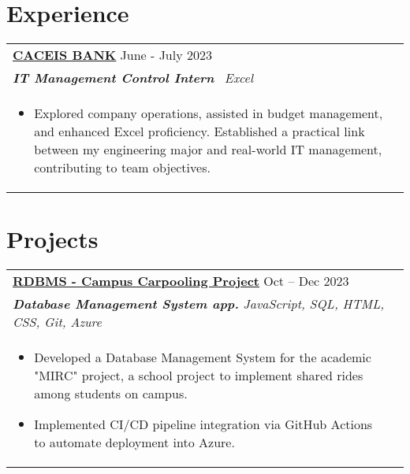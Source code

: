 \documentclass[a4paper,8pt]{article}
\begin{document}
\section{Experience}
\begin{tabularx}{\linewidth}{ @{}l r@{} }
\textbf{\uline{\href{https://www.linkedin.com/company/caceis/}{CACEIS BANK}}} \hfill \color[HTML]{371e77} June - July 2023 \\[4pt]
\color[HTML]{371e77}\textbf{\textit{IT Management Control Intern}}\ \hfill \color[HTML]{4B28A4} \textit{Excel} \\[5pt]
\begin{minipage}[t]{\linewidth}
    \begin{itemize}[nosep,after=\strut, leftmargin=2em, itemsep=2pt]
        \item Explored company operations, assisted in budget management, and enhanced Excel proficiency. Established a practical link between my engineering major and real-world IT management, contributing to team objectives.
    \end{itemize}
\end{minipage}
\end{tabularx}

\section{Projects}
\begin{tabularx}{\linewidth}{ @{}l r@{} }
\color[HTML]{1C033C} \textbf{\uline{\href{https://www.ibechoual-portfolio.codes/work/mirc}{ RDBMS - Campus Carpooling Project}}} \hfill \color[HTML]{371e77} Oct -- Dec 2023 \\[4pt]
\color[HTML]{371e77}\textbf{\textit{Database Management System app.}} \hfill \color[HTML]{4B28A4} \textit{JavaScript, SQL, HTML, CSS, Git, Azure} \\[5pt]
\begin{minipage}[t]{\linewidth}
    \begin{itemize}[nosep,after=\strut, leftmargin=2em, itemsep=2pt]
        \item Developed a Database Management System for the academic "MIRC" project, a school project to implement shared rides among students on campus.
        \item Implemented CI/CD pipeline integration via GitHub Actions to automate deployment into Azure.
    \end{itemize}
\end{minipage}
\end{tabularx}
\end{document}
